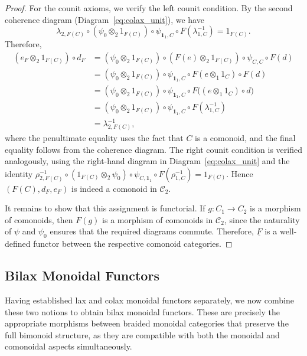 \documentclass{amsart}
\begin{document}
\begin{proof}
For the counit axioms, we verify the left counit condition. By the second coherence diagram (Diagram~\ref{eq:colax_unit}), we have
\[
\lambda_{2, F(C)} \circ (\psi_0 \otimes_2 1_{F(C)}) \circ \psi_{\mathbf{1}_1, C} \circ F(\lambda_{1,C}^{-1}) = 1_{F(C)}.
\]
Therefore,
\begin{align*}
(e_F \otimes_2 1_{F(C)}) \circ d_F
&= (\psi_0 \otimes_2 1_{F(C)}) \circ (F(e) \otimes_2 1_{F(C)}) \circ \psi_{C,C} \circ F(d) \\
&= (\psi_0 \otimes_2 1_{F(C)}) \circ \psi_{\mathbf{1}_1, C} \circ F(e \otimes_1 1_C) \circ F(d) \\
&= (\psi_0 \otimes_2 1_{F(C)}) \circ \psi_{\mathbf{1}_1, C} \circ F\bigl( (e \otimes_1 1_C) \circ d \bigr) \\
&= (\psi_0 \otimes_2 1_{F(C)}) \circ \psi_{\mathbf{1}_1, C} \circ F(\lambda_{1,C}^{-1}) \\
&= \lambda_{2, F(C)}^{-1},
\end{align*}
where the penultimate equality uses the fact that $C$ is a comonoid, and the final equality follows from the coherence diagram. The right counit condition is verified analogously, using the right-hand diagram in Diagram~\ref{eq:colax_unit} and the identity $\rho_{2, F(C)}^{-1} \circ (1_{F(C)} \otimes_2 \psi_0) \circ \psi_{C, \mathbf{1}_1} \circ F(\rho_{1,C}^{-1}) = 1_{F(C)}$. Hence $(F(C), d_F, e_F)$ is indeed a comonoid in $\mathcal{C}_2$.

It remains to show that this assignment is functorial. If $g \colon C_1 \to C_2$ is a morphism of comonoids, then $F(g)$ is a morphism of comonoids in $\mathcal{C}_2$, since the naturality of $\psi$ and $\psi_0$ ensures that the required diagrams commute. Therefore, $\underline{F}$ is a well-defined functor between the respective comonoid categories.
\end{proof}

\subsection{Bilax Monoidal Functors}

Having established lax and colax monoidal functors separately, we now combine these two notions to obtain bilax monoidal functors. These are precisely the appropriate morphisms between braided monoidal categories that preserve the full bimonoid structure, as they are compatible with both the monoidal and comonoidal aspects simultaneously.
\end{document}
